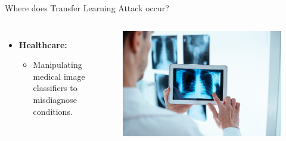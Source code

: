 \begin{frame}{Where does Transfer Learning Attack occur?}
\begin{columns}[T]
        \begin{itemize}
            \item \textbf{\large Healthcare:}
            \begin{itemize}
                \item Manipulating medical image classifiers to misdiagnose conditions.
            \end{itemize}
        \end{itemize}
        \begin{figure}[h]
            \centering
            \includegraphics[width=0.55\linewidth]{img/X-ray_results.png}
        \end{figure}
    \end{columns}
\end{frame}

